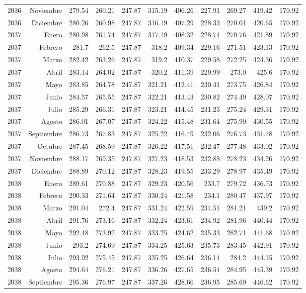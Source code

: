 \documentclass{article}%
\begin{document}
\begin{longtable}{|l r|r|r|r|r|r|r|r|r|r|}
2036&Noviembre&279.54&260.21&247.87&315.19&406.26&227.91&269.27&419.42&170.92\\%
2036&Diciembre&280.26&260.98&247.87&316.19&407.29&228.33&270.01&420.65&170.92\\%
2037&Enero&280.98&261.74&247.87&317.19&408.32&228.74&270.76&421.89&170.92\\%
2037&Febrero&281.7&262.5&247.87&318.2&409.34&229.16&271.51&423.13&170.92\\%
2037&Marzo&282.42&263.26&247.87&319.2&410.37&229.58&272.25&424.36&170.92\\%
2037&Abril&283.14&264.02&247.87&320.2&411.39&229.99&273.0&425.6&170.92\\%
2037&Mayo&283.85&264.78&247.87&321.21&412.41&230.41&273.75&426.84&170.92\\%
2037&Junio&284.57&265.55&247.87&322.21&413.43&230.82&274.49&428.07&170.92\\%
2037&Julio&285.29&266.31&247.87&323.21&414.45&231.23&275.24&429.31&170.92\\%
2037&Agosto&286.01&267.07&247.87&324.22&415.48&231.64&275.99&430.55&170.92\\%
2037&Septiembre&286.73&267.83&247.87&325.22&416.49&232.06&276.73&431.78&170.92\\%
2037&Octubre&287.45&268.59&247.87&326.22&417.51&232.47&277.48&433.02&170.92\\%
2037&Noviembre&288.17&269.35&247.87&327.23&418.53&232.88&278.23&434.26&170.92\\%
2037&Diciembre&288.89&270.12&247.87&328.23&419.55&233.29&278.97&435.49&170.92\\%
2038&Enero&289.61&270.88&247.87&329.23&420.56&233.7&279.72&436.73&170.92\\%
2038&Febrero&290.33&271.64&247.87&330.24&421.58&234.1&280.47&437.97&170.92\\%
2038&Marzo&291.04&272.4&247.87&331.24&422.59&234.51&281.21&439.2&170.92\\%
2038&Abril&291.76&273.16&247.87&332.24&423.61&234.92&281.96&440.44&170.92\\%
2038&Mayo&292.48&273.92&247.87&333.25&424.62&235.33&282.71&441.68&170.92\\%
2038&Junio&293.2&274.69&247.87&334.25&425.63&235.73&283.45&442.91&170.92\\%
2038&Julio&293.92&275.45&247.87&335.25&426.64&236.14&284.2&444.15&170.92\\%
2038&Agosto&294.64&276.21&247.87&336.26&427.65&236.54&284.95&445.39&170.92\\%
2038&Septiembre&295.36&276.97&247.87&337.26&428.66&236.95&285.69&446.62&170.92\\%

\end{longtable}
\end{document}
